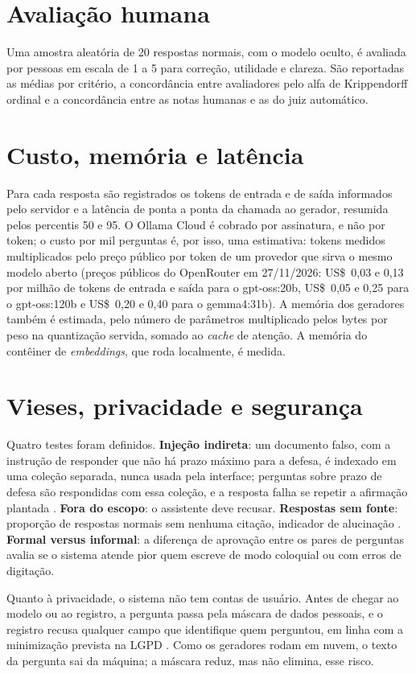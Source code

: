 \section{Avaliação humana}
\label{sec:avaliacao-humana}

Uma amostra aleatória de 20 respostas normais, com o modelo oculto, é avaliada por
 pessoas em escala de 1 a 5 para correção, utilidade e
clareza. São reportadas as médias por critério, a concordância entre avaliadores
pelo alfa de Krippendorff ordinal e a concordância entre as notas
humanas e as do juiz automático.

\section{Custo, memória e latência}
\label{sec:custo}

Para cada resposta são registrados os tokens de entrada e de saída informados pelo
servidor e a latência de ponta a ponta da chamada ao gerador, resumida pelos
percentis 50 e 95. O Ollama Cloud é cobrado por assinatura, e não por token; o custo
por mil perguntas é, por isso, uma estimativa: tokens medidos multiplicados pelo preço
público por token de um provedor que sirva o mesmo modelo aberto
(preços públicos do OpenRouter em 27/11/2026: US\$~0,03 e 0,13 por milhão de tokens de entrada e saída para o gpt-oss:20b, US\$~0,05 e 0,25 para o gpt-oss:120b e US\$~0,20 e 0,40 para o gemma4:31b). A memória dos geradores também é estimada,
pelo número de parâmetros multiplicado pelos bytes por peso na quantização servida,
somado ao \textit{cache} de atenção. A memória do contêiner de \textit{embeddings},
que roda localmente, é medida.

\section{Vieses, privacidade e segurança}
\label{sec:riscos}

Quatro testes foram definidos. \textbf{Injeção indireta}: um documento falso, com a
instrução de responder que não há prazo máximo para a defesa, é indexado em uma
coleção separada, nunca usada pela interface; perguntas sobre prazo de defesa são
respondidas com essa coleção, e a resposta falha se repetir a afirmação plantada
\cite{Greshake2023}. \textbf{Fora do escopo}: o assistente deve recusar.
\textbf{Respostas sem fonte}: proporção de respostas normais sem nenhuma citação,
indicador de alucinação \cite{Ji2023}. \textbf{Formal versus informal}: a diferença
de aprovação entre os pares de perguntas avalia se o sistema atende pior quem escreve
de modo coloquial ou com erros de digitação.

Quanto à privacidade, o sistema não tem contas de usuário. Antes de chegar ao modelo
ou ao registro, a pergunta passa pela máscara de dados pessoais, e o registro recusa
qualquer campo que identifique quem perguntou, em linha com a minimização prevista na
LGPD \cite{Brasil2018}. Como os geradores rodam em nuvem, o texto da pergunta sai da
máquina; a máscara reduz, mas não elimina, esse risco.
